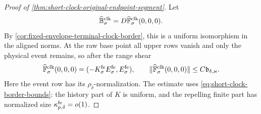 \begin{proof}[Proof of
\cref{thm:short-clock-original-endpoint-segment}]
Let
\[
 \widehat{\mathbb B}_\sigma^{\rm clk}
 =D\widehat{\mathbb F}_\sigma^{\rm clk}(0,0,0).
\]
By \cref{cor:fixed-envelope-terminal-clock-border}, this is a uniform
isomorphism in the aligned norms.  At the raw base point all upper rows
vanish and only the physical event remains, so after the range shear
\begin{equation}
 \widehat{\mathbb F}_\sigma^{\rm clk}(0,0,0)
 =(-K_\sigma^{\rm fe}E_\sigma^{\rm fe},E_\sigma^{\rm fe}),\qquad
 \|\widehat{\mathbb F}_\sigma^{\rm clk}(0,0,0)\|
 \le C\mathfrak b_{\delta,\varkappa}.           \label{eq:proof-clock-base-residual}
\end{equation}
Here the event row has its \(\rho_\delta\)-normalization.  The estimate
uses \cref{eq:short-clock-border-bounds}: the history part of \(K\) is
uniform, and the repelling finite part has normalized size
\(\kappa_{p,\delta}^{\rm fe}=o(1)\).


\end{proof}
